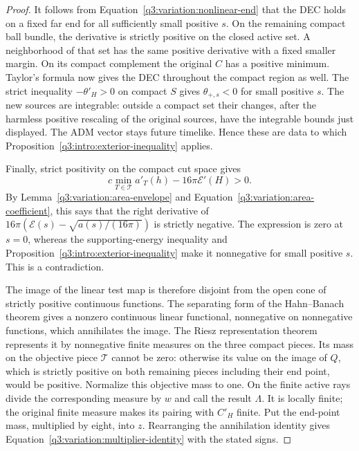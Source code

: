 \begin{proof}
It follows from Equation~\eqref{q3:variation:nonlinear-end} that the DEC
holds on a fixed far end for all sufficiently small positive $s$.
On the remaining compact ball bundle, the derivative is strictly
positive on the closed active set.  A neighborhood of that set has
the same positive derivative with a fixed smaller margin.  On its
compact complement the original $C$ has a positive minimum.
Taylor's formula now gives the DEC throughout the compact region
as well.  The strict inequality $-\theta'_H>0$ on compact $S$ gives
$\theta_{+,s}<0$ for small positive $s$.  The new sources are
integrable: outside a compact set their changes, after the harmless
positive rescaling of the original sources, have the integrable
bounds just displayed.  The ADM vector stays future timelike.
Hence these are data to which
Proposition~\ref{q3:intro:exterior-inequality} applies.

Finally, strict positivity on the compact cut space gives
\[
 c\min_{T\in\mathcal T}a'_T(h)-16\pi\mathcal E'(H)>0.
\]
By Lemma~\ref{q3:variation:area-envelope} and
Equation~\eqref{q3:variation:area-coefficient}, this says that the
right derivative of
$16\pi(\mathcal E(s)-\sqrt{a(s)/(16\pi)})$ is strictly negative.
The expression is zero at $s=0$, whereas the supporting-energy
inequality and Proposition~\ref{q3:intro:exterior-inequality} make it
nonnegative for small positive $s$.  This is a contradiction.

The image of the linear test map is therefore disjoint from the
open cone of strictly positive continuous functions.  The separating
form of the Hahn--Banach theorem
\cite[Theorem~3.4(a), pp.~59--60]{RudinFunctionalAnalysis1991}
gives a nonzero continuous linear functional, nonnegative on nonnegative
functions, which annihilates
the image.  The Riesz representation theorem
\cite[Theorem~2.14, pp.~40--41]{RudinRealComplex1987} represents it by
nonnegative finite measures on the three compact pieces.  Its mass
on the objective piece $\mathcal T$ cannot be zero: otherwise its
value on the image of $Q$, which is strictly positive on both
remaining pieces including their end point, would be positive.
Normalize this objective mass to one.  On the finite active rays
divide the corresponding measure by $w$ and call the result
$\Lambda$.  It is locally finite; the original finite measure makes
its pairing with $C'_H$ finite.  Put the end-point mass, multiplied
by eight, into $z$.  Rearranging the annihilation identity gives
Equation~\eqref{q3:variation:multiplier-identity} with the stated signs.
\end{proof}

